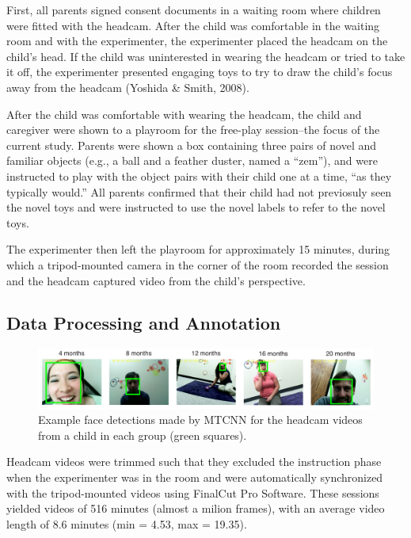 \documentclass[10pt, letterpaper]{article}
\begin{document}
First, all parents signed consent documents in a waiting room where
children were fitted with the headcam. After the child was comfortable
in the waiting room and with the experimenter, the experimenter placed
the headcam on the child's head. If the child was uninterested in
wearing the headcam or tried to take it off, the experimenter presented
engaging toys to try to draw the child's focus away from the headcam
(Yoshida \& Smith, 2008).

After the child was comfortable with wearing the headcam, the child and
caregiver were shown to a playroom for the free-play session--the focus
of the current study. Parents were shown a box containing three pairs of
novel and familiar objects (e.g., a ball and a feather duster, named a
``zem''), and were instructed to play with the object pairs with their
child one at a time, ``as they typically would.'' All parents confirmed
that their child had not previosuly seen the novel toys and were
instructed to use the novel labels to refer to the novel toys.

The experimenter then left the playroom for approximately 15 minutes,
during which a tripod-mounted camera in the corner of the room recorded
the session and the headcam captured video from the child's perspective.

\subsection{Data Processing and
Annotation}\label{data-processing-and-annotation}

\begin{figure}
\includegraphics[width=6in]{images/framesample.pdf}
\caption{\label{fig:frames} Example face detections made by MTCNN for the headcam videos from a child in each group  (green squares).}
\end{figure}

Headcam videos were trimmed such that they excluded the instruction
phase when the experimenter was in the room and were automatically
synchronized with the tripod-mounted videos using FinalCut Pro Software.
These sessions yielded videos of 516 minutes (almost a milion frames),
with an average video length of 8.6 minutes (min = 4.53, max = 19.35).
\end{document}
